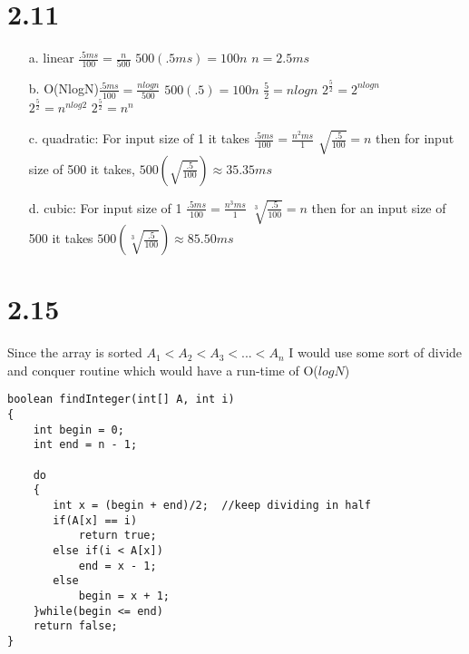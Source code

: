 \documentclass[12pt,letterpaper]{article}
\begin{document}
\section*{2.11}
\begin{itemize}
\item[a.] linear $\displaystyle \frac{.5 ms}{100} = \frac{n}{500}$ \hspace*{.5 cm} $500(.5 ms) = 100n$ \hspace*{.5 cm} $n = 2.5 ms$
\item[b.] O(NlogN)\hspace*{.2 cm}$\displaystyle \frac{.5 ms}{100} = \frac{n log n}{500}$ \hspace*{.5 cm} $500(.5) = 100n$ \hspace*{.5 cm} $\frac{5}{2} = n log n$ \hspace*{.5 cm} $2^{\frac{5}{2}} = 2^{n log n}$\\
$2^{\frac{5}{2}} = n^{n log 2}$ \hspace*{.5 cm} $2^{\frac{5}{2}} = n^n$
\item[c.] quadratic: For input size of 1 it takes\hspace*{.5 cm} $\displaystyle \frac{.5 ms}{100} = \frac{n^2ms}{1}$ \hspace*{.5 cm} $\sqrt{\frac{.5}{100}} = n$ \hspace*{.5 cm} then for input size of 500 it takes, \hspace*{.5 cm} $500(\sqrt{\frac{.5}{100}}) \approx 35.35 ms$
\item[d.] cubic: For input size of 1 \hspace*{.5 cm} $\displaystyle \frac{.5 ms}{100} = \frac{n^3ms}{1}$ \hspace*{.5 cm} $\sqrt[3]{\frac{.5}{100}} = n$ \hspace*{.5 cm} then for an input size of 500 it takes $500(\sqrt[3]{\frac{.5}{100}}) \approx 85.50ms$
\end{itemize}
\section*{2.15}
Since the array is sorted $A_1 < A_2 < A_3 < ... < A_n$ I would use some sort of divide and conquer routine which would have a run-time of O($logN$)
\begin{verbatim}
boolean findInteger(int[] A, int i)
{
    int begin = 0;
    int end = n - 1;
       
    do
    {
       int x = (begin + end)/2;  //keep dividing in half
       if(A[x] == i)
           return true;
       else if(i < A[x])
           end = x - 1;
       else
           begin = x + 1;
    }while(begin <= end)
    return false;
}
\end{verbatim}
\newpage
\end{document}
